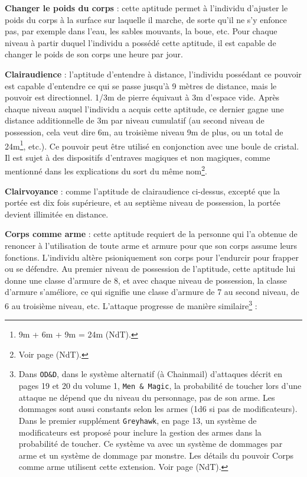 {\bigskip

\textbf{Changer le poids du corps} : cette aptitude permet à l'individu d'ajuster le poids du corps à la surface sur laquelle il marche, de sorte qu'il ne s'y enfonce pas, par exemple dans l'eau, les sables mouvants, la boue, etc. Pour chaque niveau à partir duquel l'individu a possédé cette aptitude, il est capable de changer le poids de son corps une heure par jour.

\bigskip

\textbf{Clairaudience} : l'aptitude d'entendre à distance, l'individu possédant ce pouvoir est capable d'entendre ce qui se passe jusqu'à 9 mètres de distance, mais le pouvoir est directionnel. 1/3m de pierre équivaut à 3m d'espace vide. Après chaque niveau auquel l'individu a acquis cette aptitude, ce dernier gagne une distance additionnelle de 3m par niveau cumulatif (au second niveau de possession, cela veut dire 6m, au troisième niveau 9m de plus, ou un total de 24m\footnote{9m + 6m + 9m = 24m (NdT).}, etc.). Ce pouvoir peut être utilisé en conjonction avec une boule de cristal. Il est sujet à des dispositifs d'entraves magiques et non magiques, comme mentionné dans les explications du sort du même nom\footnote{Voir page \pageref{sort-clairaudience} (NdT).}.

\bigskip

\textbf{Clairvoyance} : comme l'aptitude de clairaudience ci-dessus, excepté que la portée est dix fois supérieure, et au septième niveau de possession, la portée devient illimitée en distance.

\bigskip

\label{ew-corps-comme-arme}\textbf{Corps comme arme} : cette aptitude requiert de la personne qui l'a obtenue de renoncer à l'utilisation de toute arme et armure pour que son corps assume leurs fonctions. L'individu altère psioniquement son corps pour l'endurcir pour frapper ou se défendre. Au premier niveau de possession de l'aptitude, cette aptitude lui donne une classe d'armure de 8, et avec chaque niveau de possession, la classe d'armure s'améliore, ce qui signifie une classe d'armure de 7 au second niveau, de 6 au troisième niveau, etc. L'attaque progresse de manière similaire\footnote{Dans \texttt{OD\&D}, dans le système alternatif (à Chainmail) d'attaques décrit en pages 19 et 20 du volume 1, \texttt{Men \& Magic}, la probabilité de toucher lors d'une attaque ne dépend que du niveau du personnage, pas de son arme. Les dommages sont aussi constants selon les armes (1d6 si pas de modificateurs). Dans le premier supplément \texttt{Greyhawk}, en page 13, un système de modificateurs est proposé pour inclure la gestion des armes dans la probabilité de toucher. Ce système va avec un système de dommages par arme et un système de dommage par monstre. Les détails du pouvoir Corps comme arme utilisent cette extension. Voir page \pageref{combat-alternatif} (NdT). } :

}
